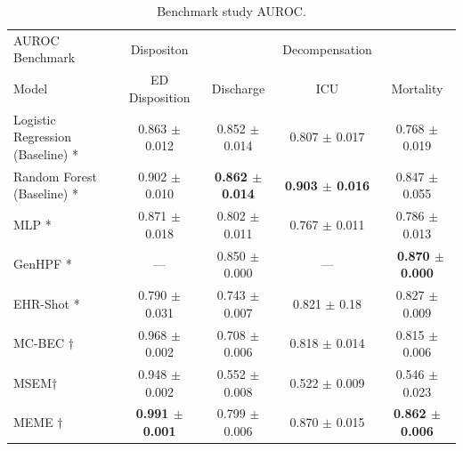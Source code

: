 \documentclass[pmlr]{jmlr}%
\begin{document}
\begin{table}[H]
\caption{Benchmark study AUROC.}
\label{r2}
\begin{adjustbox}{width=\textwidth}
\begin{small}
\begin{tabular}{l|c|ccc}
\toprule
AUROC Benchmark & Dispositon & & Decompensation &\\
Model & ED Disposition & Discharge & ICU & Mortality \\
\midrule
Logistic Regression (Baseline) * &0.863 $\pm$ 0.012&0.852 $\pm$ 0.014 & 0.807 $\pm$ 0.017 & 0.768 $\pm$ 0.019\\
Random Forest (Baseline) *& 0.902 $\pm$ 0.010 & \textbf{0.862 $\pm$ 0.014} & \textbf{0.903 $\pm$ 0.016} &   0.847 $\pm$ 0.055\\
MLP *& 0.871 $\pm$ 0.018 & 0.802 $\pm$ 0.011 & 0.767 $\pm$ 0.011 & 0.786 $\pm$ 0.013 \\
GenHPF * & --- & 0.850 $\pm$ 0.000 & ---& \textbf{~0.870 $\pm$ 0.000} \\
EHR-Shot *& 0.790 $\pm$ 0.031 & 0.743 $\pm$ 0.007 & 0.821 $\pm$ 0.18 & 0.827 $\pm$ 0.009\\
MC-BEC $\dagger$& 0.968 $\pm$ 0.002 & 0.708 $\pm$ 0.006 & 0.818 $\pm$ 0.014 & 0.815 $\pm$ 0.006 \\
MSEM$\dagger$& 0.948 $\pm$ 0.002 & 0.552 $\pm$ 0.008 & 0.522 $\pm$ 0.009 & 0.546 $\pm$ 0.023\\
MEME $\dagger$& \textbf{0.991 $\pm$ 0.001} & 0.799 $\pm$ 0.006 & 0.870 $\pm$ 0.015 & \textbf{0.862 $\pm$ 0.006} \\
\bottomrule
\end{tabular}
\end{small}
\end{adjustbox}
\end{table}
\vspace*{-0.5cm}
\end{document}
